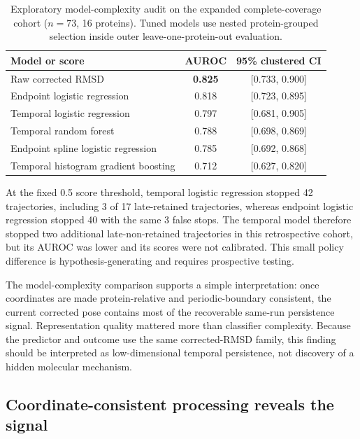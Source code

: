 \documentclass[11pt]{article}
\begin{document}
\begin{table}[htbp]
\centering
\caption{Exploratory model-complexity audit on the expanded complete-coverage cohort ($n=73$, 16 proteins). Tuned models use nested protein-grouped selection inside outer leave-one-protein-out evaluation.}
\label{tab:model-audit}
\begin{tabularx}{\textwidth}{Xcc}
\toprule
Model or score & AUROC & 95\% clustered CI \\
\midrule
Raw corrected RMSD & \textbf{0.825} & [0.733, 0.900] \\
Endpoint logistic regression & 0.818 & [0.723, 0.895] \\
Temporal logistic regression & 0.797 & [0.681, 0.905] \\
Temporal random forest & 0.788 & [0.698, 0.869] \\
Endpoint spline logistic regression & 0.785 & [0.692, 0.868] \\
Temporal histogram gradient boosting & 0.712 & [0.627, 0.820] \\
\bottomrule
\end{tabularx}
\end{table}

At the fixed 0.5 score threshold, temporal logistic regression stopped 42 trajectories, including 3 of 17 late-retained trajectories, whereas endpoint logistic regression stopped 40 with the same 3 false stops. The temporal model therefore stopped two additional late-non-retained trajectories in this retrospective cohort, but its AUROC was lower and its scores were not calibrated. This small policy difference is hypothesis-generating and requires prospective testing.

The model-complexity comparison supports a simple interpretation: once coordinates are made protein-relative and periodic-boundary consistent, the current corrected pose contains most of the recoverable same-run persistence signal. Representation quality mattered more than classifier complexity. Because the predictor and outcome use the same corrected-RMSD family, this finding should be interpreted as low-dimensional temporal persistence, not discovery of a hidden molecular mechanism.

\subsection{Coordinate-consistent processing reveals the signal}
\end{document}
